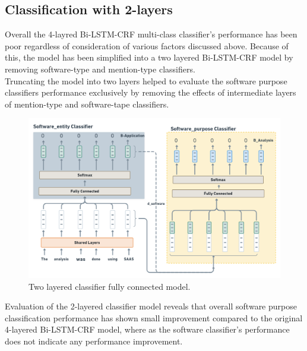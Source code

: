 \subsection{Classification with 2-layers}
\label{sec:chapter06:2lc}

Overall the 4-layred \ac{Bi-LSTM-CRF} multi-class classifier’s performance has been poor regardless of consideration of various factors discussed above. Because of this, the model has been simplified into a two layered Bi-LSTM-CRF model by removing software-type and mention-type classifiers. \\

Truncating the model into two layers helped to evaluate the software purpose classifiers performance exclusively by removing the effects of intermediate layers of mention-type and software-tape classifiers. \\

\begin{figure}[htbp]
	\centering
	\includegraphics[width=.90\textwidth]{4.graphics/figures/ch_5/2LC}
	\caption{Two layered classifier fully connected model.}
	\label{fig:chapter06:with}
\end{figure}

Evaluation of the 2-layered classifier model reveals that overall software purpose classification performance has shown small improvement compared to the original 4-layered \ac{Bi-LSTM-CRF} model, where as the software classifier’s performance does not indicate any performance improvement.  

